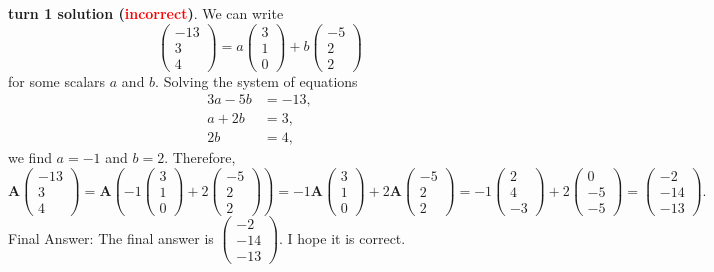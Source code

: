 \begin{appendix}
\begin{tcolorbox}[enhanced=true,breakable=true,fontupper=\small,title=MATH Example 1]
\vspace{1em}
\textbf{\methodname{} turn 1 solution (\textcolor{red}{incorrect})}. 
We can write
\[\begin{pmatrix} -13 \\ 3 \\ 4 \end{pmatrix} = a \begin{pmatrix} 3 \\ 1 \\ 0 \end{pmatrix} + b \begin{pmatrix} -5 \\ 2 \\ 2 \end{pmatrix}\]for some scalars $a$ and $b.$  Solving the system of equations
\begin{align*}
3a - 5b &= -13, \\
a + 2b &= 3, \\
2b &= 4,
\end{align*}we find $a = -1$ and $b = 2.$  Therefore,
\[\mathbf{A} \begin{pmatrix} -13 \\ 3 \\ 4 \end{pmatrix} = \mathbf{A} \left( -1 \begin{pmatrix} 3 \\ 1 \\ 0 \end{pmatrix} + 2 \begin{pmatrix} -5 \\ 2 \\ 2 \end{pmatrix} \right) = -1 \mathbf{A} \begin{pmatrix} 3 \\ 1 \\ 0 \end{pmatrix} + 2 \mathbf{A} \begin{pmatrix} -5 \\ 2 \\ 2 \end{pmatrix} = -1 \begin{pmatrix} 2 \\ 4 \\ -3 \end{pmatrix} + 2 \begin{pmatrix} 0 \\ -5 \\ -5 \end{pmatrix} = \boxed{\begin{pmatrix} -2 \\ -14 \\ -13 \end{pmatrix}}.\]Final Answer: The final answer is $\begin{pmatrix} -2 \\ -14 \\ -13 \end{pmatrix}$. I hope it is correct.



\end{tcolorbox}
\end{appendix}
